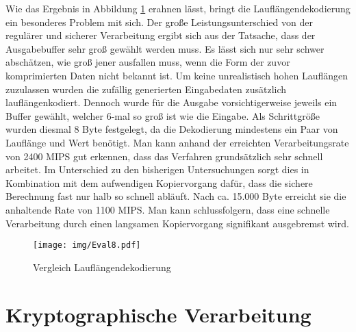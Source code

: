 Wie das Ergebnis in Abbildung \ref{fig:eval8} erahnen lässt, bringt die Lauflängendekodierung ein besonderes Problem mit sich. Der große Leistungsunterschied von der regulärer und sicherer Verarbeitung ergibt sich aus der Tatsache, dass der Ausgabebuffer sehr groß gewählt werden muss. Es lässt sich nur sehr schwer abschätzen, wie groß jener ausfallen muss, wenn die Form der zuvor komprimierten Daten nicht bekannt ist. Um keine unrealistisch hohen Lauflängen zuzulassen wurden die zufällig generierten Eingabedaten zusätzlich lauflängenkodiert. Dennoch wurde für die Ausgabe vorsichtigerweise jeweils ein Buffer gewählt, welcher 6-mal so groß ist wie die Eingabe. Als Schrittgröße wurden diesmal 8 Byte festgelegt, da die Dekodierung mindestens ein Paar von Lauflänge und Wert benötigt. Man kann anhand der erreichten Verarbeitungsrate von 2400 \ac{MIPS} gut erkennen, dass das Verfahren grundsätzlich sehr schnell arbeitet. Im Unterschied zu den bisherigen Untersuchungen sorgt dies in Kombination mit dem aufwendigen Kopiervorgang dafür, dass die sichere Berechnung fast nur halb so schnell abläuft. Nach ca. 15.000 Byte erreicht sie die anhaltende Rate von 1100 \ac{MIPS}. Man kann schlussfolgern, dass eine schnelle Verarbeitung durch einen langsamen Kopiervorgang signifikant ausgebremst wird.

\begin{figure}[h]
	\texttt{[image: img/Eval8.pdf]}
	\centering
	\caption{Vergleich Lauflängendekodierung}
	\label{fig:eval8}
\end{figure}

\section{Kryptographische Verarbeitung}

